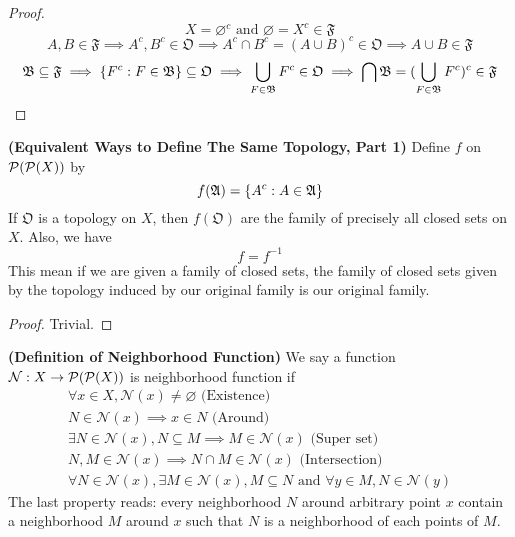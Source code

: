 \documentclass{report}
\begin{document}
\begin{proof}
\begin{equation}
X=\varnothing^c\text{ and }\varnothing=X^c\in \mathfrak{F}
\end{equation}
\begin{equation}
A,B\in \mathfrak{F}\implies A^c,B^c \in \mathfrak{O}\implies A^c \cap B^c=(A\cup B)^c \in \mathfrak{O} \implies A\cup  B \in \mathfrak{F}
\end{equation}
\begin{equation}
\mathfrak{B}\subseteq \mathfrak{F}\implies \{ F^c:F \in \mathfrak{B} \}\subseteq \mathfrak{O}\implies \bigcup_{F\in \mathfrak{B}}F^c \in \mathfrak{O}\implies \bigcap \mathfrak{B}= (\bigcup_{F \in\mathfrak{B}} F^c)^c \in \mathfrak{F}
\end{equation}
\end{proof}
\begin{theorem}
\label{2.5.3}
\textbf{(Equivalent Ways to Define The Same Topology, Part 1)} Define $f$ on $\mathcal{P}(\mathcal{P}(X))$ by 
\begin{equation}
f(\mathfrak{A})=\{ A^c:A\in \mathfrak{A} \}
\end{equation}
If $\mathfrak{O}$ is a topology on $X$, then  $f(\mathfrak{O})$ are the family of precisely all closed sets on $X$. Also, we have
\begin{equation}
f=f^{-1}
\end{equation}
This mean if we are given a family of closed sets, the family of closed sets given by the topology induced by our original family is our original family.   
\end{theorem}
\begin{proof}
Trivial. 
\end{proof}
\begin{definition}
\label{2.5.4}
\textbf{(Definition of Neighborhood Function)} We say a function $\mathcal{N}:X\rightarrow \mathcal{P}(\mathcal{P}(X))$ is neighborhood function if 
\begin{gather}
\forall x \in X,\mathcal{N}(x)\neq \varnothing\text{ (Existence) }\\
N \in \mathcal{N}(x)\implies x \in N\text{ (Around) }\\
\exists N \in \mathcal{N}(x), N\subseteq M\implies M\in \mathcal{N}(x)\text{ (Super set) }\\
N,M \in \mathcal{N}(x)\implies N \cap M\in \mathcal{N}(x)\text{ (Intersection) }\\
\forall N\in \mathcal{N}(x),\exists M\in \mathcal{N}(x), M \subseteq N\text{ and }\forall y \in M, N \in \mathcal{N}(y)
\end{gather}
The last property reads: every neighborhood $N$ around arbitrary point $x$ contain a neighborhood $M$ around $x$ such that $N$ is a neighborhood of each points of $M$.
\end{definition}
\end{document}
